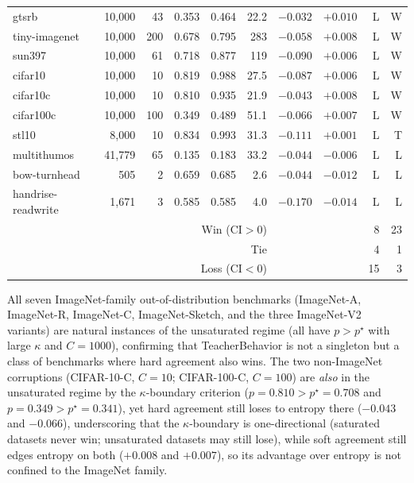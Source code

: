 \documentclass[a4paper,fleqn]{cas-sc}
\begin{document}
\begin{table}[t]
\begin{tabular}{lrrrrrlrrr}
gtsrb              & 10,000 &   43 & 0.353 & 0.464 & 22.2 & $-0.032$ & $+0.010$ & L & W \\
tiny-imagenet      & 10,000 &  200 & 0.678 & 0.795 &  283 & $-0.058$ & $+0.008$ & L & W \\
sun397             & 10,000 &   61 & 0.718 & 0.877 &  119 & $-0.090$ & $+0.006$ & L & W \\
cifar10            & 10,000 &   10 & 0.819 & 0.988 & 27.5 & $-0.087$ & $+0.006$ & L & W \\
cifar10c           & 10,000 &   10 & 0.810 & 0.935 & 21.9 & $-0.043$ & $+0.008$ & L & W \\
cifar100c          & 10,000 &  100 & 0.349 & 0.489 & 51.1 & $-0.066$ & $+0.007$ & L & W \\
stl10              &  8,000 &   10 & 0.834 & 0.993 & 31.3 & $-0.111$ & $+0.001$ & L & T \\
multithumos        & 41,779 &   65 & 0.135 & 0.183 & 33.2 & $-0.044$ & $-0.006$ & L & L \\
bow-turnhead       &    505 &    2 & 0.659 & 0.685 &  2.6 & $-0.044$ & $-0.012$ & L & L \\
handrise-readwrite &  1,671 &    3 & 0.585 & 0.585 &  4.0 & $-0.170$ & $-0.014$ & L & L \\
\midrule
\multicolumn{6}{r}{Win (CI$>$0)} & & & 8 & 23 \\
\multicolumn{6}{r}{Tie} & & & 4 & 1 \\
\multicolumn{6}{r}{Loss (CI$<$0)} & & & 15 & 3 \\
\bottomrule
\end{tabular}
\end{table}

All seven ImageNet-family out-of-distribution benchmarks (ImageNet-A, ImageNet-R, ImageNet-C, ImageNet-Sketch, and the three ImageNet-V2 variants) are natural instances of the unsaturated regime (all have $p > p^\star$ with large $\kappa$ and $C{=}1000$), confirming that TeacherBehavior is not a singleton but a class of benchmarks where hard agreement also wins.
The two non-ImageNet corruptions (CIFAR-10-C, $C{=}10$; CIFAR-100-C, $C{=}100$) are \emph{also} in the unsaturated regime by the $\kappa$-boundary criterion ($p = 0.810 > p^\star = 0.708$ and $p = 0.349 > p^\star = 0.341$), yet hard agreement still loses to entropy there ($-0.043$ and $-0.066$), underscoring that the $\kappa$-boundary is one-directional (saturated datasets never win; unsaturated datasets may still lose), while soft agreement still edges entropy on both ($+0.008$ and $+0.007$), so its advantage over entropy is not confined to the ImageNet family.
\end{document}
